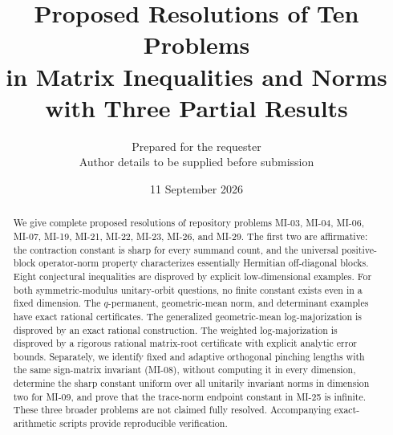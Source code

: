 
\title{Proposed Resolutions of Ten Problems\texorpdfstring{\\}{ }in Matrix Inequalities and Norms\large\texorpdfstring{\\}{ }with Three Partial Results}
\author{Prepared for the requester\\\small Author details to be supplied before submission}
\date{11 September 2026}

\maketitle
\draftnotice
\begin{abstract}
We give complete proposed resolutions of repository problems MI-03, MI-04, MI-06, MI-07, MI-19, MI-21, MI-22, MI-23, MI-26, and MI-29. The first two are affirmative: the contraction constant is sharp for every summand count, and the universal positive-block operator-norm property characterizes essentially Hermitian off-diagonal blocks. Eight conjectural inequalities are disproved by explicit low-dimensional examples. For both symmetric-modulus unitary-orbit questions, no finite constant exists even in a fixed dimension. The $q$-permanent, geometric-mean norm, and determinant examples have exact rational certificates. The generalized geometric-mean log-majorization is disproved by an exact rational construction. The weighted log-majorization is disproved by a rigorous rational matrix-root certificate with explicit analytic error bounds. Separately, we identify fixed and adaptive orthogonal pinching lengths with the same sign-matrix invariant (MI-08), without computing it in every dimension, determine the sharp constant uniform over all unitarily invariant norms in dimension two for MI-09, and prove that the trace-norm endpoint constant in MI-25 is infinite. These three broader problems are not claimed fully resolved. Accompanying exact-arithmetic scripts provide reproducible verification.
\end{abstract}
